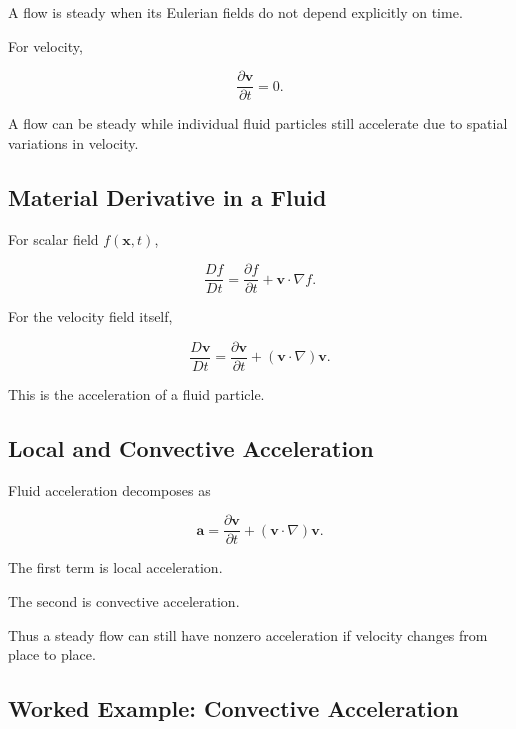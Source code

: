 A flow is steady when its Eulerian fields do not depend explicitly on time.

For velocity,

\[
\boxed{
\frac{\partial\mathbf{v}}{\partial t}
=
0.
}
\]

A flow can be steady while individual fluid particles still accelerate due
to spatial variations in velocity.

\subsection{Material Derivative in a Fluid}
\label{subsec:fluid-material-derivative}

For scalar field \(f(\mathbf{x},t)\),

\[
\boxed{
\frac{Df}{Dt}
=
\frac{\partial f}{\partial t}
+
\mathbf{v}\cdot\nabla f.
}
\]

For the velocity field itself,

\[
\boxed{
\frac{D\mathbf{v}}{Dt}
=
\frac{\partial\mathbf{v}}{\partial t}
+
(\mathbf{v}\cdot\nabla)\mathbf{v}.
}
\]

This is the acceleration of a fluid particle.

\subsection{Local and Convective Acceleration}
\label{subsec:local-convective-acceleration}

Fluid acceleration decomposes as

\[
\boxed{
\mathbf{a}
=
\frac{\partial\mathbf{v}}{\partial t}
+
(\mathbf{v}\cdot\nabla)\mathbf{v}.
}
\]

The first term is local acceleration.

The second is convective acceleration.

Thus a steady flow can still have nonzero acceleration if velocity changes
from place to place.

\subsection{Worked Example: Convective Acceleration}
\label{subsec:worked-convective-acceleration}

